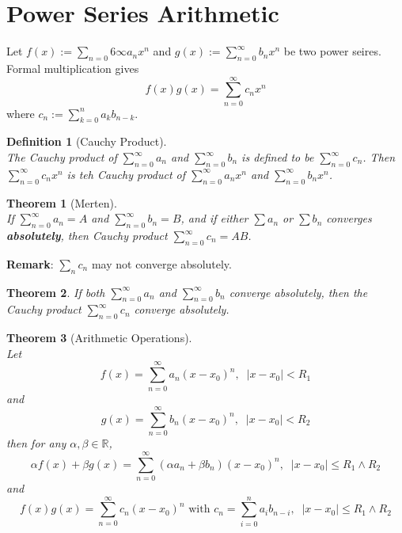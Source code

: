 \documentclass[12pt]{article}
\newtheorem{definition}{Definition}[section]
\newtheorem{theorem}{Theorem}[section]
\theoremstyle{definition}
\begin{document}
\section{Power Series Arithmetic}
Let $f(x):=\sum_{n=0}6\infty a_nx^n$ and $g(x):=\sum_{n=0}^\infty b_nx^n$ be two power seires. Formal multiplication gives
\[
f(x)g(x)=\sum_{n=0}^\infty c_nx^n
\]
where $c_n:=\sum_{k=0}^n a_kb_{n-k}$.
\begin{definition}[Cauchy Product] 
\hfill\\\normalfont The Cauchy product of $\sum_{n=0}^\infty a_n$ and $\sum_{n=0}^\infty b_n$ is defined to be $\sum_{n=0}^\infty c_n$. Then $\sum_{n=0}^\infty c_nx^n$ is teh Cauchy product of $\sum_{n=0}^\infty a_nx^n$ and $\sum_{n=0}^\infty b_nx^n$.
\end{definition}
\begin{theorem}[Merten]
\hfill\\\normalfont If $\sum_{n=0}^\infty a_n=A$ and $\sum_{n=0}^\infty b_n=B$, and if either $\sum a_n$ or $\sum b_n$ converges \textbf{absolutely}, then Cauchy product $\sum_{n=0}^\infty c_n=AB$.
\end{theorem}
\textbf{Remark}: $\sum_n c_n$ may not converge absolutely. 
\begin{theorem}\normalfont If both $\sum_{n=0}^\infty a_n$ and $\sum_{n=0}^\infty b_n$ converge absolutely, then the Cauchy product $\sum_{n=0}^\infty c_n$ converge absolutely.\end{theorem}
\begin{theorem}[Arithmetic Operations]
\hfill\\\normalfont Let 
\[
f(x)=\sum_{n=0}^\infty a_n(x-x_0)^n, \;\;|x-x_0|<R_1
\]
and
\[
g(x)=\sum_{n=0}^\infty b_n(x-x_0)^n, \;\;|x-x_0|<R_2
\]
then for any $\alpha, \beta\in \mathbb{R}$,
\[
\alpha f(x)+\beta g(x)=\sum_{n=0}^\infty (\alpha a_n+\beta b_n)(x-x_0)^n, \;\;|x-x_0|\leq R_1\land R_2
\]
and
\[
f(x)g(x)=\sum_{n=0}^\infty c_n (x-x_0)^n \text{ with }c_n=\sum_{i=0}^n a_ib_{n-i},\;\;|x-x_0|\leq R_1\land R_2
\]
\end{theorem}
\clearpage
\end{document}
